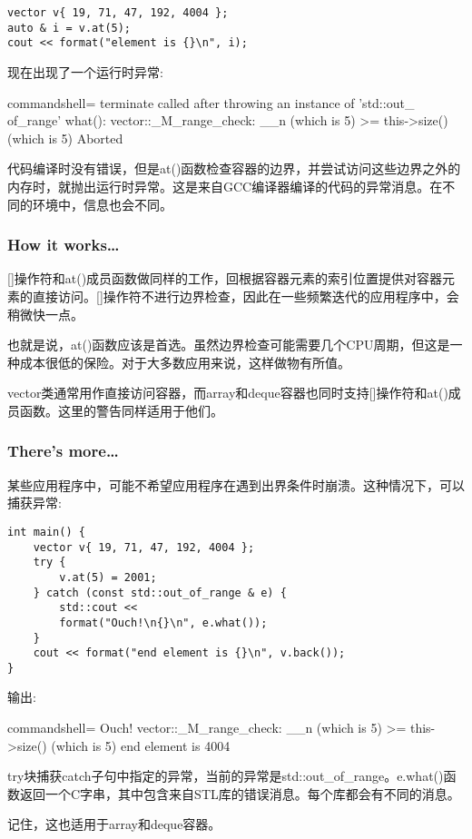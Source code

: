 \begin{itemize}
\begin{lstlisting}[style=styleCXX]
vector v{ 19, 71, 47, 192, 4004 };
auto & i = v.at(5);
cout << format("element is {}\n", i);
\end{lstlisting}

现在出现了一个运行时异常:

\begin{tcblisting}{commandshell={}}
terminate called after throwing an instance of 'std::out_
of_range'
	what(): vector::_M_range_check: __n (which is 5) >=
this->size() (which is 5)
Aborted
\end{tcblisting}

代码编译时没有错误，但是at()函数检查容器的边界，并尝试访问这些边界之外的内存时，就抛出运行时异常。这是来自GCC编译器编译的代码的异常消息。在不同的环境中，信息也会不同。
\end{itemize}

\subsubsection{How it works…}

[]操作符和at()成员函数做同样的工作，回根据容器元素的索引位置提供对容器元素的直接访问。[]操作符不进行边界检查，因此在一些频繁迭代的应用程序中，会稍微快一点。

也就是说，at()函数应该是首选。虽然边界检查可能需要几个CPU周期，但这是一种成本很低的保险。对于大多数应用来说，这样做物有所值。

vector类通常用作直接访问容器，而array和deque容器也同时支持[]操作符和at()成员函数。这里的警告同样适用于他们。

\subsubsection{There's more…}

某些应用程序中，可能不希望应用程序在遇到出界条件时崩溃。这种情况下，可以捕获异常:

\begin{lstlisting}[style=styleCXX]
int main() {
	vector v{ 19, 71, 47, 192, 4004 };
	try {
		v.at(5) = 2001;
	} catch (const std::out_of_range & e) {
		std::cout <<
		format("Ouch!\n{}\n", e.what());
	}
	cout << format("end element is {}\n", v.back());
}
\end{lstlisting}

输出:

\begin{tcblisting}{commandshell={}}
Ouch!
vector::_M_range_check: __n (which is 5) >= this->size() (which is 5)
end element is 4004
\end{tcblisting}

try块捕获catch子句中指定的异常，当前的异常是std::out\_of\_range。e.what()函数返回一个C字串，其中包含来自STL库的错误消息。每个库都会有不同的消息。

记住，这也适用于array和deque容器。











